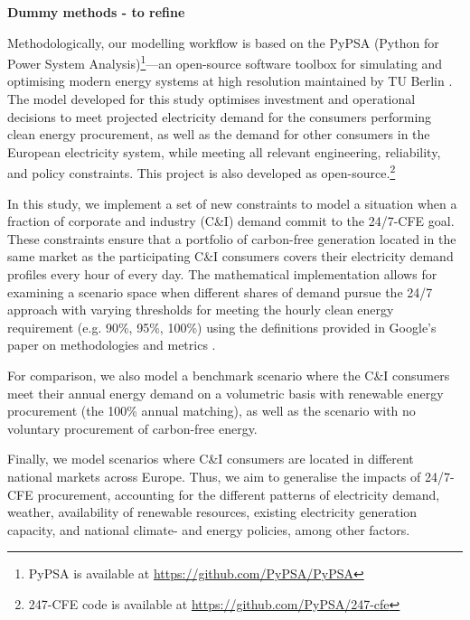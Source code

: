 \textbf{Dummy methods - to refine}

Methodologically, our modelling workflow is based on the PyPSA (Python for Power System Analysis)\footnote{PyPSA is available at \url{https://github.com/PyPSA/PyPSA}}—an open-source software toolbox for simulating and optimising modern energy systems at high resolution maintained by TU Berlin \cite{Brown-PyPSA,HORSCH-PyPSAEUR}. 
The model developed for this study optimises investment and operational decisions to meet projected electricity demand for the consumers performing clean energy procurement, as well as the demand for other consumers in the European electricity system, while meeting all relevant engineering, reliability, and policy constraints. 
This project is also developed as open-source.\footnote{247-CFE code is available at  \url{https://github.com/PyPSA/247-cfe}}

In this study, we implement a set of new constraints to model a situation when a fraction of corporate and industry (C\&I) demand commit to the 24/7-CFE goal. 
These constraints ensure that a portfolio of carbon-free generation located in the same market as the participating C\&I consumers covers their electricity demand profiles every hour of every day. 
The mathematical implementation allows for examining a scenario space when different shares of demand pursue the 24/7 approach with varying thresholds for meeting the hourly clean energy requirement (e.g. 90\%, 95\%, 100\%) using the definitions provided in Google's paper on methodologies and metrics \cite{Google-methods}.

For comparison, we also model a benchmark scenario where the C\&I consumers meet their annual energy demand on a volumetric basis with renewable energy procurement (the 100\% annual matching), as well as the scenario with no voluntary procurement of carbon-free energy.

Finally, we model scenarios where C\&I consumers are located in different national markets across Europe. 
Thus, we aim to generalise the impacts of 24/7-CFE procurement, accounting for the different patterns of electricity demand, weather, availability of renewable resources, existing electricity generation capacity, and national climate- and energy policies, among other factors.